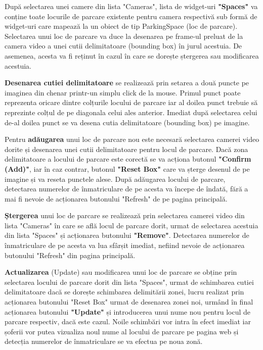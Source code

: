 \documentclass[12pt]{article}
\begin{document}
Dup\u{a} selectarea unei camere din lista "Cameras", lista de widget-uri \textbf{"Spaces"} va conține toate locurile de parcare existente pentru camera respectiv\u{a} sub form\u{a} de widget-uri care mapeaz\u{a} la un obiect de tip ParkingSpace (loc de parcare). Selectarea unui loc de parcare va duce la desenarea pe frame-ul preluat de la camera video a unei cutii delimitatoare (bounding box) \^{i}n jurul acestuia. De asemenea, acesta va fi reținut \^{i}n cazul \^{i}n care se dorește ștergerea sau modificarea acestuia.

\textbf{Desenarea cutiei delimitatoare} se realizeaz\u{a} prin setarea a dou\u{a} puncte pe imaginea din chenar printr-un simplu click de la mouse. Primul punct poate reprezenta oricare dintre colțurile locului de parcare iar al doilea punct trebuie s\u{a} reprezinte colțul de pe diagonala celui ales anterior. Imediat dup\u{a} selectarea celui de-al doilea punct se va desena cutia delimitatoare (bounding box) pe imagine.

Pentru \textbf{ad\u{a}ugarea} unui loc de parcare nou este necesar\u{a} selectarea camerei video dorite și desenarea unei cutii delimitatoare pentru locul de parcare. Dac\u{a} zona delimitatoare a locului de parcare este corect\u{a} se va acționa butonul \textbf{"Confirm (Add)"}, iar \^{i}n caz contrar, butonul \textbf{"Reset Box"} care va șterge desenul de pe imagine și va reseta punctele alese. Dup\u{a} ad\u{a}ugarea locului de parcare, detectarea numerelor de \^{i}nmatriculare de pe acesta va \^{i}ncepe de \^{i}ndat\u{a}, f\u{a}r\u{a} a mai fi nevoie de acționarea butonului "Refresh" de pe pagina principal\u{a}.

\textbf{Ștergerea} unui loc de parcare se realizeaz\u{a} prin selectarea camerei video din lista "Cameras" \^{i}n care se afl\u{a} locul de parcare dorit, urmat de selectarea acestuia din lista "Spaces" și acționarea butonului \textbf{"Remove"}. Detectarea numerelor de \^{i}nmatriculare de pe acesta va lua sf\^{a}rșit imediat, nefiind nevoie de acționarea butonului "Refresh" din pagina principal\u{a}.

\textbf{Actualizarea} (Update) sau modificarea unui loc de parcare se obține prin selectarea locului de parcare dorit din lista "Spaces", urmat de schimbarea cutiei delimitatoare dac\u{a} se dorește schimbarea delimit\u{a}rii zonei, lucru realizat prin acționarea butonului "Reset Box" urmat de desenarea zonei noi, urm\^{a}nd \^{i}n final acționarea butonului \textbf{"Update"} și introducerea unui nume nou pentru locul de parcare respectiv, dac\u{a} este cazul. Noile schimb\u{a}ri vor intra \^{i}n efect imediat iar șoferii vor putea vizualiza noul nume al locului de parcare pe pagina web și detecția numerelor de \^{i}nmatriculare se va efectua pe noua zon\u{a}.
\end{document}
